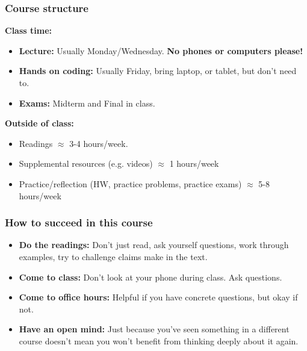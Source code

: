 \documentclass[serif,mathserif]{beamer}
\begin{document}
\begin{frame}
\frametitle{Course structure}

{\bf Class time:} 
\begin{itemize}
\item {\bf Lecture:} Usually Monday/Wednesday. {\bf No phones or computers please!}
\item {\bf Hands on coding:} Usually Friday, bring laptop, or tablet, but don't need to.
\item {\bf Exams:} Midterm and Final in class. 
\end{itemize}


\pause 
{\bf Outside of class:} 
\begin{itemize}
\item Readings $\approx$ 3-4 hours/week. 
\item Supplemental resources (e.g. videos) $\approx$ 1 hours/week
\item Practice/reflection (HW, practice problems, practice exams) $\approx$ 5-8 hours/week 
\end{itemize}


\end{frame}



\begin{frame} 
\frametitle{How to succeed in this course}
\begin{itemize}
\item {\bf Do the readings:} Don't just read, ask yourself questions, work through examples, try to challenge claims make in the text. 
\item {\bf Come to class:} Don't look at your phone during class. Ask questions. 
\item {\bf Come to office hours:} Helpful if you have concrete questions, but okay if not. 
\item {\bf Have an open mind:} Just because you've seen something in a different course doesn't mean you won't benefit from thinking deeply about it again. 
\end{itemize}

\end{frame}
\end{document}

